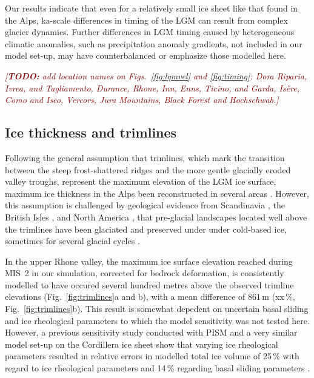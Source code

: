 \documentclass[tc, manuscript]{copernicus}
\newcommand{\todo}[1]{\textcolor{darkred}{\emph{[\textbf{TODO:} #1]}}}
\begin{document}
    Our results indicate that even for a relatively small ice sheet like that
    found in the Alps, ka-scale differences in timing of the LGM can
    result from complex glacier dynamics. Further differences in LGM timing
    caused by heterogeneous climatic anomalies, such as precipitation
    anomaly gradients, not included in our model set-up, may have
    counterbalanced or emphasize those modelled here.

    \todo{add location names on Figs.~\ref{fig:lgmvel} and \ref{fig:timing}:
    Dora Riparia, Ivrea, and Tagliamento, Durance, Rhone, Inn, Enns, Ticino,
    and Garda, Isère, Como and Iseo, Vercors, Jura Mountains, Black Forest and
    Hochschwab.}


\subsection{Ice thickness and trimlines}
\label{sec:thickness}

    Following the general assumption that trimlines, which mark the transition
    between the steep frost-shattered ridges and the more gentle glacially eroded
    valley troughs, represent the maximum elevation of the LGM ice surface,
    maximum ice thickness in the Alps been reconstructed in several areas
    \citep{Husen.1987, Florineth.1998, Florineth.Schluchter.1998,
    Kelly.etal.2004, Bini.etal.2009, Coutterand.2010, Cossart.etal.2012}.
    However, this assumption is challenged by geological evidence from
    Scandinavia \citep[e.g.,][]{Kleman.1994, Kleman.Borgstrom.1994},
    the British Isles \citep[e.g.,][]{Fabel.etal.2012}, and
    North America \citep[e.g.,][]{Kleman.etal.2010}, that pre-glacial landscapes
    located well above the trimlines have been glaciated and preserved under
    under cold-based ice, sometimes for several glacial cycles
    \citep{Stroeven.etal.2002}.

    In the upper Rhone valley, the maximum ice surface elevation reached
    during MIS~2 in our simulation, corrected for bedrock deformation, is
    consistently modelled to have occured several hundred metres above the
    observed trimline elevations (Fig.~\ref{fig:trimlines}a and b), with a mean
    difference of 861\,m (xx\,\%, Fig.~\ref{fig:trimlines}b). This result is
    somewhat depedent on uncertain basal sliding and ice rheological parameters
    to which the model sensitivity was not tested here. However, a previous
    sensitivity study conducted with PISM and a very similar model set-up on
    the Cordillera ice sheet show that varying ice rheological parameters
    resulted in relative errors in modelled total ice volume of 25\,\unit{\%}
    with regard to ice rheological parameters and 14\,\unit{\%} regarding basal
    sliding parameters \citep[Fig.~7]{Seguinot.etal.2016}.
\end{document}
